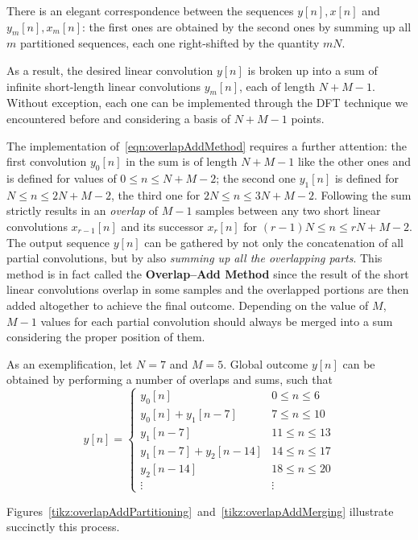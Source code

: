 \documentclass[\documentfontsize, twocolumn]{\classname}
\begin{document}
There is an elegant correspondence between the sequences $y[n], x[n]$ and $y_m[n], x_m[n]$: the first ones are obtained by the second ones by summing up all $m$ partitioned sequences, each one right-shifted by the quantity $mN$.

As a result, the desired linear convolution $y[n]$ is broken up into a sum of infinite short-length linear convolutions $y_m[n]$, each of length $N + M - 1$. Without exception, each one can be implemented through the DFT technique we encountered before and considering a basis of $N + M - 1$ points.

The implementation of~\ref{eqn:overlapAddMethod} requires a further attention: the first convolution $y_0[n]$ in the sum is of length $N + M - 1$ like the other ones and is defined for values of $0 \leq n \leq N + M - 2$; the second one $y_1[n]$ is defined for $N \leq n \leq 2N + M - 2$, the third one for $2N \leq n \leq 3N + M - 2$. Following the sum strictly results in an \emph{overlap} of $M - 1$ samples between any two short linear convolutions $x_{r-1}[n]$ and its successor $x_r[n]$ for $(r-1)N \leq n \leq rN + M - 2$. The output sequence $y[n]$ can be gathered by not only the concatenation of all partial convolutions, but by also \emph{summing up all the overlapping parts}. This method is in fact called the \textbf{Overlap--Add Method} since the result of the short linear convolutions overlap in some samples and the overlapped portions are then added altogether to achieve the final outcome. Depending on the value of $M$, $M-1$ values for each partial convolution should always be merged into a sum considering the proper position of them.

As an exemplification, let $N = 7$ and $M = 5$. Global outcome $y[n]$ can be obtained by performing a number of overlaps and sums, such that
\[
    y[n] =
    \left\{
        \begin{array}{ll}
            y_0[n] & 0 \leq n \leq 6\\
            y_0[n] + y_1[n - 7] & 7 \leq n \leq 10\\
            y_1[n - 7] & 11 \leq n \leq 13\\
            y_1[n - 7] + y_2[n - 14] & 14 \leq n \leq 17\\
            y_2[n - 14] & 18 \leq n \leq 20\\
            \vdots & \vdots
        \end{array}
    \right.
\]

Figures~\ref{tikz:overlapAddPartitioning}~and~\ref{tikz:overlapAddMerging} illustrate succinctly this process.
\end{document}
